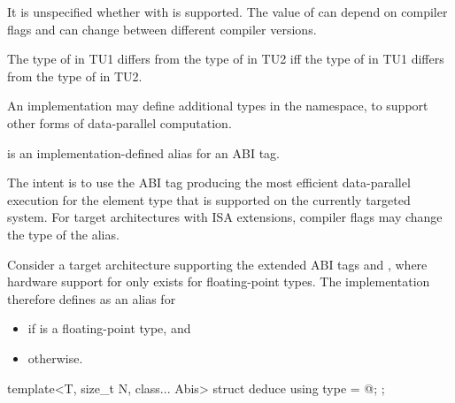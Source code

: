\pnum
\begin{note}It is unspecified whether  with  is supported. The value of  can depend on compiler flags and can change between different compiler versions.\end{note}

\pnum
  The type of  in TU1 differs from the type of
   in TU2 iff the type of  in TU1 differs from
  the type of  in TU2.

\pnum
An implementation may define additional  types in the  namespace, to support other forms of data-parallel computation.

\pnum
{} is an implementation-defined alias for an ABI tag. \begin{note}The intent is to use the ABI tag producing the most efficient data-parallel execution for the element type  that is supported on the currently targeted system. For target architectures with ISA extensions, compiler flags may change the type of the  alias.\end{note}
\begin{example}
  Consider a target architecture supporting the extended ABI tags  and , where hardware support for  only exists for floating-point types. The implementation therefore defines  as an alias for
  \begin{itemize}
    \item {} if  is a floating-point type, and
    \item {} otherwise.
  \end{itemize}
\end{example}

\begin{itemdecl}
template<T, size_t N, class... Abis> struct deduce { using type = @\seebelow@; };
\end{itemdecl}


